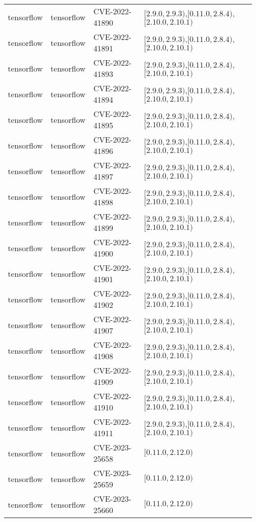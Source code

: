 \begin{tabular}{llll}
tensorflow & tensorflow & CVE-2022-41890 & $[2.9.0,2.9.3)$,$[0.11.0,2.8.4)$,$[2.10.0,2.10.1)$ \\
tensorflow & tensorflow & CVE-2022-41891 & $[2.9.0,2.9.3)$,$[0.11.0,2.8.4)$,$[2.10.0,2.10.1)$ \\
tensorflow & tensorflow & CVE-2022-41893 & $[2.9.0,2.9.3)$,$[0.11.0,2.8.4)$,$[2.10.0,2.10.1)$ \\
tensorflow & tensorflow & CVE-2022-41894 & $[2.9.0,2.9.3)$,$[0.11.0,2.8.4)$,$[2.10.0,2.10.1)$ \\
tensorflow & tensorflow & CVE-2022-41895 & $[2.9.0,2.9.3)$,$[0.11.0,2.8.4)$,$[2.10.0,2.10.1)$ \\
tensorflow & tensorflow & CVE-2022-41896 & $[2.9.0,2.9.3)$,$[0.11.0,2.8.4)$,$[2.10.0,2.10.1)$ \\
tensorflow & tensorflow & CVE-2022-41897 & $[2.9.0,2.9.3)$,$[0.11.0,2.8.4)$,$[2.10.0,2.10.1)$ \\
tensorflow & tensorflow & CVE-2022-41898 & $[2.9.0,2.9.3)$,$[0.11.0,2.8.4)$,$[2.10.0,2.10.1)$ \\
tensorflow & tensorflow & CVE-2022-41899 & $[2.9.0,2.9.3)$,$[0.11.0,2.8.4)$,$[2.10.0,2.10.1)$ \\
tensorflow & tensorflow & CVE-2022-41900 & $[2.9.0,2.9.3)$,$[0.11.0,2.8.4)$,$[2.10.0,2.10.1)$ \\
tensorflow & tensorflow & CVE-2022-41901 & $[2.9.0,2.9.3)$,$[0.11.0,2.8.4)$,$[2.10.0,2.10.1)$ \\
tensorflow & tensorflow & CVE-2022-41902 & $[2.9.0,2.9.3)$,$[0.11.0,2.8.4)$,$[2.10.0,2.10.1)$ \\
tensorflow & tensorflow & CVE-2022-41907 & $[2.9.0,2.9.3)$,$[0.11.0,2.8.4)$,$[2.10.0,2.10.1)$ \\
tensorflow & tensorflow & CVE-2022-41908 & $[2.9.0,2.9.3)$,$[0.11.0,2.8.4)$,$[2.10.0,2.10.1)$ \\
tensorflow & tensorflow & CVE-2022-41909 & $[2.9.0,2.9.3)$,$[0.11.0,2.8.4)$,$[2.10.0,2.10.1)$ \\
tensorflow & tensorflow & CVE-2022-41910 & $[2.9.0,2.9.3)$,$[0.11.0,2.8.4)$,$[2.10.0,2.10.1)$ \\
tensorflow & tensorflow & CVE-2022-41911 & $[2.9.0,2.9.3)$,$[0.11.0,2.8.4)$,$[2.10.0,2.10.1)$ \\
tensorflow & tensorflow & CVE-2023-25658 & $[0.11.0,2.12.0)$ \\
tensorflow & tensorflow & CVE-2023-25659 & $[0.11.0,2.12.0)$ \\
tensorflow & tensorflow & CVE-2023-25660 & $[0.11.0,2.12.0)$ \\

\end{tabular}
